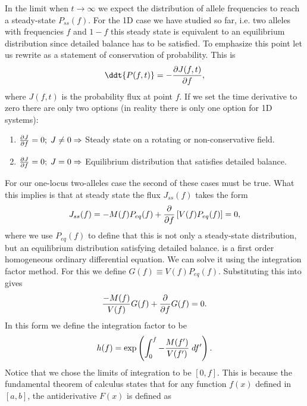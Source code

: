 In the limit when $t \rightarrow \infty$ we expect the distribution of allele
frequencies to reach a steady-state $P_{ss}(f)$. For the 1D case we have
studied so far, i.e. two alleles with frequencies $f$ and $1 - f$ this steady
state is equivalent to an equilibrium distribution since detailed balance has
to be satisfied. To emphasize this point let us rewrite
 as a statement of conservation of probability. This
is
\begin{equation}
  \ddt{P(f, t)} = - {\partial J(f, t) \over \partial f},
\end{equation}
where $J(f, t)$ is the probability flux at point $f$. If we set the time
derivative to zero there are only two options (in reality there is only one
option for 1D systems):
\begin{enumerate}
  \item ${\partial J \over \partial f} = 0; \; J \neq 0 \Rightarrow$ Steady
  state on a rotating or non-conservative field.
  \item ${\partial J \over \partial f} = 0; \; J = 0 \Rightarrow$ Equilibrium
  distribution that satisfies detailed balance.
\end{enumerate}
For our one-locus two-alleles case the second of these cases must be true.
What this implies is that at steady state the flux $J_{ss}(f)$ takes the form
\begin{equation}
  J_{ss}(f) = - M(f) P_{eq}(f) + {\partial \over \partial f}
  \left[ V(f) P_{eq}(f) \right] = 0,
  \label{eq_flux_eq}
\end{equation}
where we use $P_{eq}(f)$ to define that this is not only a steady-state
distribution, but an equilibrium distribution satisfying detailed balance.
 is a first order homogeneous ordinary differential equation.
We can solve it using the integration factor method. For this we define
$G(f) \equiv V(f)P_{eq}(f)$. Substituting this into  gives
\begin{equation}
  {- M(f) \over V(f)} G(f) + {\partial \over \partial f} G(f) = 0.
  \label{eq_ode_ss}
\end{equation}
In this form we define the integration factor to be
\begin{equation}
  h(f) = \exp \left( \int_0^f -{M(f') \over V(f')} \; df' \right).
\end{equation}
Notice that we chose the limits of integration to be $[0, f]$. This is because
the fundamental theorem of calculus states that for any function $f(x)$ defined
in $[a, b]$, the antiderivative $F(x)$ is defined as
